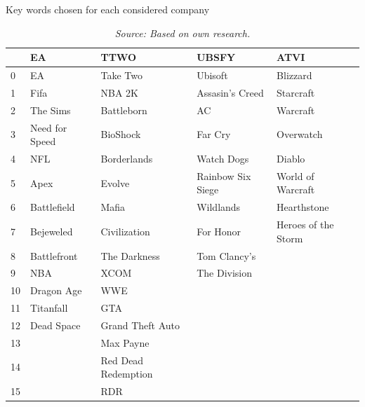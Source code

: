 \documentclass[11pt]{article} %
\begin{document}
\begin{table}[hbt!]
\centering
\caption{Key words chosen for each considered company}
\begin{tabular}{lllll}
\toprule
{} &              EA &                 TTWO &              UBSFY &                 ATVI \\
\midrule
0  &              EA &             Take Two &            Ubisoft &             Blizzard \\
1  &            Fifa &               NBA 2K &    Assasin's Creed &            Starcraft \\
2  &        The Sims &           Battleborn &                 AC &             Warcraft \\
3  &  Need for Speed &             BioShock &            Far Cry &            Overwatch \\
4  &             NFL &          Borderlands &         Watch Dogs &               Diablo \\
5  &            Apex &               Evolve &  Rainbow Six Siege &    World of Warcraft \\
6  &     Battlefield &                Mafia &          Wildlands &          Hearthstone \\
7  &       Bejeweled &         Civilization &          For Honor &  Heroes of the Storm \\
8  &     Battlefront &         The Darkness &       Tom Clancy's &                  \\
9  &             NBA &                 XCOM &       The Division &                  \\
10 &      Dragon Age &                  WWE &                &                  \\
11 &       Titanfall &                  GTA &                &                  \\
12 &      Dead Space &     Grand Theft Auto &                &                  \\
13 &             &            Max Payne &                &                  \\
14 &             &  Red Dead Redemption &                &                  \\
15 &             &                  RDR &                &                  \\
\bottomrule
\end{tabular}
\caption*{\textit{Source: Based on own research.}}
\end{table}
\end{document}

